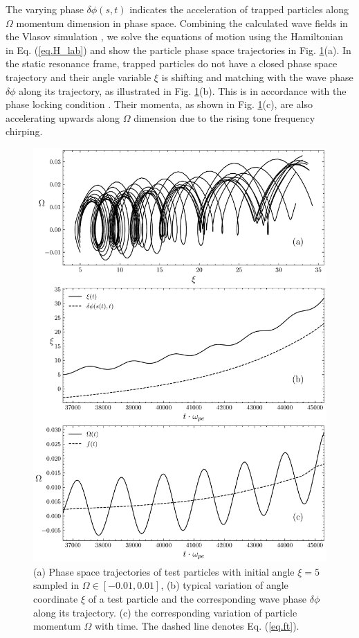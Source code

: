
The varying phase $\delta \phi(s,t)$ indicates the acceleration of trapped particles along $\Omega$ momentum dimension in phase space.
Combining the calculated wave fields  in the Vlasov simulation \cite{zheng2024}, we solve the equations of motion using the Hamiltonian in Eq. (\ref{eq.H_lab}) and show the particle phase space trajectories in Fig. \ref{fig.phaseflow}(a). 
In the static resonance frame, trapped particles do not have a closed phase space trajectory and  their angle variable $\xi$  is shifting and matching with the wave phase $\delta \phi$ along its trajectory, as illustrated in Fig. \ref{fig.phaseflow}(b). This is in accordance with the phase locking condition \cite{tao_trap-release-amplify_2021}.
Their momenta, as shown in Fig. \ref{fig.phaseflow}(c), are also accelerating upwards along $\Omega$ dimension due to the rising tone frequency chirping.

\begin{figure}
    \centering
    \includegraphics[scale=0.5]{img/phaseflow.pdf}
    \caption{(a) Phase space trajectories of  test particles with initial angle $\xi = 5$ sampled in $\Omega \in [-0.01,0.01]$, (b) typical variation of angle coordinate $\xi$ of a test particle and the corresponding wave phase $\delta \phi$ along its trajectory. (c) the corresponding variation of particle momentum $\Omega$ with time. The dashed line denotes Eq. (\ref{eq.ft}).
    \label{fig.phaseflow}
    }
\end{figure}

